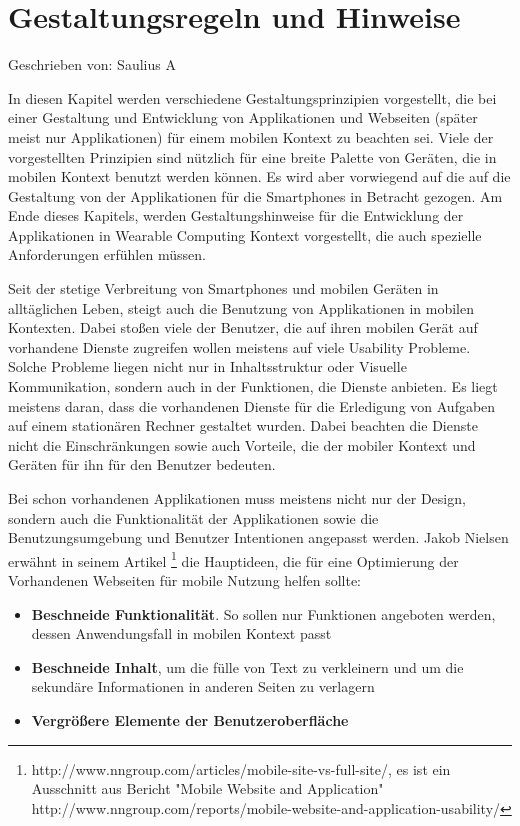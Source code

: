 
\section{Gestaltungsregeln und Hinweise}

Geschrieben von: Saulius A

In diesen Kapitel werden verschiedene Gestaltungsprinzipien vorgestellt, die bei einer Gestaltung und Entwicklung von Applikationen und Webseiten (später meist nur Applikationen) für einem mobilen Kontext zu beachten sei. Viele der vorgestellten Prinzipien sind nützlich für eine breite Palette von Geräten, die in mobilen Kontext benutzt werden können. Es wird aber vorwiegend auf die auf die Gestaltung von der Applikationen für die Smartphones in Betracht gezogen. Am Ende dieses Kapitels, werden Gestaltungshinweise für die Entwicklung der Applikationen in Wearable Computing Kontext vorgestellt, die auch spezielle Anforderungen erfühlen müssen.

Seit der stetige Verbreitung von Smartphones und mobilen Geräten in alltäglichen Leben, steigt auch die Benutzung von Applikationen in mobilen Kontexten. Dabei stoßen viele der Benutzer, die auf ihren mobilen Gerät auf vorhandene Dienste zugreifen wollen meistens auf viele Usability Probleme. Solche Probleme liegen nicht nur in Inhaltsstruktur oder Visuelle Kommunikation, sondern auch in der Funktionen, die Dienste anbieten. Es liegt meistens daran, dass die vorhandenen Dienste für die Erledigung von Aufgaben auf einem stationären Rechner gestaltet wurden. Dabei beachten die Dienste nicht die Einschränkungen sowie auch Vorteile, die der mobiler Kontext und Geräten für ihn für den Benutzer bedeuten.

Bei schon vorhandenen Applikationen muss meistens nicht nur der Design, sondern auch die Funktionalität der Applikationen sowie die Benutzungsumgebung und Benutzer Intentionen angepasst werden. Jakob Nielsen erwähnt in seinem Artikel \footnote{http://www.nngroup.com/articles/mobile-site-vs-full-site/, es ist ein Ausschnitt aus Bericht "Mobile Website and Application" http://www.nngroup.com/reports/mobile-website-and-application-usability/} die Hauptideen, die für eine Optimierung der Vorhandenen Webseiten für mobile Nutzung helfen sollte:
\begin{itemize}
	\item \textbf{Beschneide Funktionalität}. So sollen nur Funktionen angeboten werden, dessen Anwendungsfall in mobilen Kontext passt
	\item \textbf{Beschneide Inhalt}, um die fülle von Text zu verkleinern und um die sekundäre Informationen in anderen Seiten zu verlagern
	\item \textbf{Vergrößere Elemente der Benutzeroberfläche}
\end{itemize}

